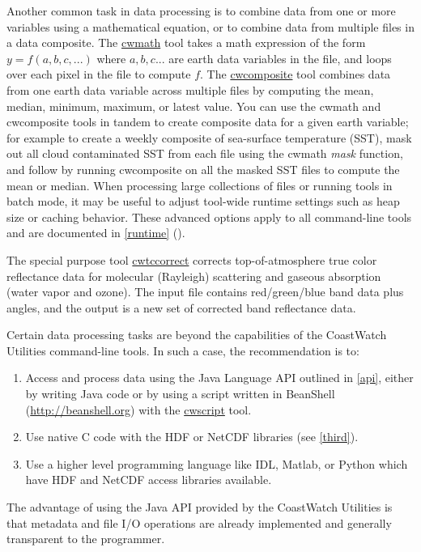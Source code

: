 Another common task in data processing is to combine data from one
or more variables using a mathematical equation, or to combine data
from multiple files in a data composite.  The \hyperlink{cwmath}{cwmath}
tool takes a math expression of the form $y = f(a,b,c,...)$ where
$a,b,c...$ are earth data variables in the file, and loops over
each pixel in the file to compute $f$.  The
\hyperlink{cwcomposite}{cwcomposite} tool combines data from one
earth data variable across multiple files by computing the mean,
median, minimum, maximum, or latest value.  You can use the cwmath
and cwcomposite tools in tandem to create composite data for a given
earth variable; for example to create a weekly composite of sea-surface
temperature (SST), mask out all cloud contaminated SST from each
file using the cwmath {\em mask} function, and follow by running
cwcomposite on all the masked SST files to compute the mean or
median.  When processing large collections of files or running tools in batch
mode, it may be useful to adjust tool-wide runtime settings such as heap size 
or caching behavior. These advanced options apply to all command-line tools 
and are documented in \autoref{runtime} ().

The special purpose tool \hyperlink{cwtccorrect}{cwtccorrect} corrects 
top-of-atmosphere true color reflectance data for molecular (Rayleigh) scattering
and gaseous absorption (water vapor and ozone). The input file contains red/green/blue 
band data plus angles, and the output is a new set of corrected band reflectance data.

Certain data processing tasks are beyond the capabilities of the
CoastWatch Utilities command-line tools.  In such a case, the recommendation
is to:
\begin{enumerate}

\item Access and process data using the Java Language API
outlined in \autoref{api}, either by writing Java code or by using a script 
written in BeanShell (\url{http://beanshell.org}) with the 
\hyperlink{cwscript}{cwscript} tool.

\item Use native C code with the HDF or NetCDF libraries (see \autoref{third}).

\item Use a higher level programming language like IDL, Matlab, or Python 
which have HDF and NetCDF access libraries available.

\end{enumerate}
The advantage of using the Java API provided by the CoastWatch
Utilities is that metadata and file I/O operations are already
implemented and generally transparent to the programmer.

